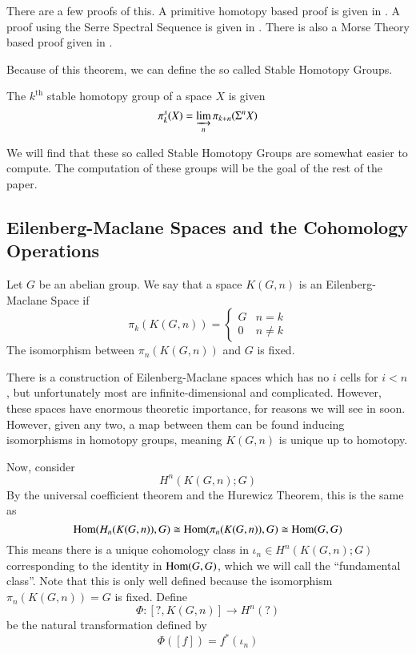 There are a few proofs of this.  A primitive homotopy based proof is given in \cite[Cor~4.24]{HatcherAT}.  
A proof using the Serre Spectral Sequence is given in \cite[Ch~12]{MosherTengora}.  
There is also a Morse Theory based proof given in \cite[Cor~22.3]{MilnorMorse}.  


Because of this theorem, we can define the so called Stable Homotopy Groups.  


\begin{Def}
  The  $k^{\mbox{th}}$ stable homotopy group of a space $X$ is given
  \[\pi_k^s(X)=\varinjlim_n \pi_{k+n}(\Sigma^n X) \]
\end{Def}

We will find that these so called Stable Homotopy Groups are somewhat easier to compute.  
The computation of these groups will be the goal of the rest of the paper.  


\subsection{Eilenberg-Maclane Spaces and the Cohomology Operations}

\begin{Def}
  Let $G$ be an abelian group.  We say that a space $K(G,n)$ is an Eilenberg-Maclane Space if
  \[\pi_k(K(G,n))=\left\{\begin{array}{cc} G & n=k \\ 0 & n\ne k\end{array}\right.\]
  The isomorphism between $\pi_n(K(G,n))$ and $G$ is fixed.  
\end{Def}
There is a construction of Eilenberg-Maclane spaces which has no $i$ cells for $i<n$, but unfortunately most are infinite-dimensional and complicated.  However, these spaces have enormous theoretic importance, for reasons we will see in soon.  However, given any two, a map between them can be found inducing isomorphisms in homotopy groups, meaning $K(G,n)$ is unique up to homotopy. 

Now, consider 
\[H^n(K(G,n);G)\]
By the universal coefficient theorem and the Hurewicz Theorem, this is the same as
\[\operatorname{Hom}\nolimits(H_n(K(G,n)),G)\cong \operatorname{Hom}\nolimits(\pi_n(K(G,n)),G)\cong \operatorname{Hom}\nolimits(G,G)\]
This means there is a unique cohomology class in $\iota_n\in H^n(K(G,n);G)$ corresponding to the identity in $\operatorname{Hom}\nolimits(G,G)$, which we will call the ``fundamental class''.  
Note that this is only well defined because the isomorphism $\pi_n(K(G,n))=G$ is fixed.  
Define
\[\Phi:[?,K(G,n)]\to H^n(?)\]
be the natural transformation defined by
\[\Phi([f]) = f^*(\iota_n)\]

